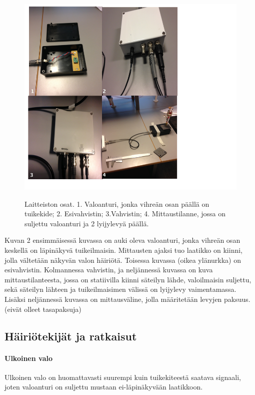 \documentclass[a4paper, 12pt]{article}
\begin{document}
\begin{figure}[!hbt]
\includegraphics[scale=0.9]{LaitteistonOsat}
\label{fig:LaitteistonOsat}
\caption{Laitteiston osat. 1. Valoanturi, jonka vihreän osan päällä on tuikekide; 2. Esivahvistin; 3.Vahvistin; 4. Mittaustilanne, jossa on suljettu valoanturi ja 2 lyijylevyä päällä.}
\end{figure}

Kuvan 2 ensimmäisessä kuvassa on auki oleva valoanturi, jonka vihreän osan keskellä on läpinäkyvä tuikeilmaisin. Mittausten ajaksi tuo laatikko on kiinni, jolla vältetään näkyvän valon häiriötä. Toisessa kuvassa (oikea ylänurkka) on esivahvistin. Kolmannessa vahvistin, ja neljännessä kuvassa on kuva mittaustilanteesta, jossa on statiivilla kiinni säteilyn lähde, valoilmaisin suljettu, sekä säteilyn lähteen ja tuikeilmaisimen välissä on lyijylevy vaimentamassa. Lisäksi neljännessä kuvassa on mittausväline, jolla määritetään levyjen paksuus. (eivät olleet tasapaksuja)

\subsection*{Häiriötekijät ja ratkaisut}
\paragraph{Ulkoinen valo\\}
Ulkoinen valo on huomattavasti suurempi kuin tuikekiteestä saatava signaali, joten valoanturi on suljettu mustaan ei-läpinäkyvään laatikkoon.
\end{document}
